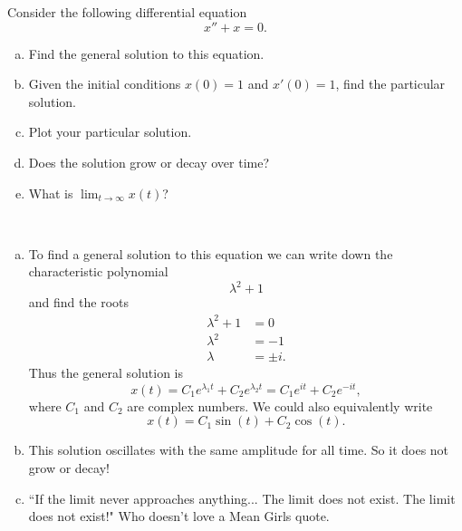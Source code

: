 \documentclass[12pt]{article} %
\begin{document}
\begin{problem}
Consider the following differential equation
\[
x''+x=0.
\]
\begin{enumerate}[(a)]
    \item Find the general solution to this equation.
    \item Given the initial conditions $x(0)=1$ and $x'(0)=1$, find the particular solution.
    \item Plot your particular solution.
    \item Does the solution grow or decay over time? 
    \item What is $\lim_{t\to \infty}x(t)$?
\end{enumerate}
\end{problem}
\begin{solution}~
\begin{enumerate}[(a)]
    \item To find a general solution to this equation we can write down the characteristic polynomial
    \[
    \lambda^2+1
    \]
    and find the roots
    \begin{align*}
        \lambda^2+1&=0\\
        \lambda^2&=-1\\
        \lambda&=\pm i.
    \end{align*}
    Thus the general solution is
    \[
    x(t)=C_1e^{\lambda_1 t}+C_2e^{\lambda_2 t}=C_1e^{it}+C_2e^{-it},
    \]
    where $C_1$ and $C_2$ are complex numbers. We could also equivalently write
    \[
    x(t)=C_1\sin(t)+C_2\cos(t).
    \]
    \item This solution oscillates with the same amplitude for all time. So it does not grow or decay!
    \item ``If the limit never approaches anything... The limit does not exist. The limit does not exist!"  Who doesn't love a Mean Girls quote.
\end{enumerate}
\end{solution}

\newpage
\end{document}
